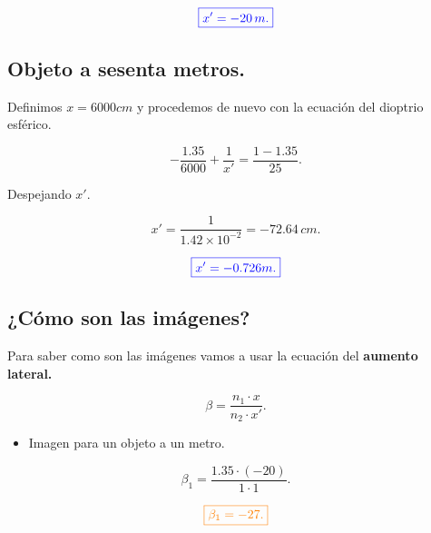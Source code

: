 \documentclass[a4paper,12pt]{article} %
\begin{document}
\vspace{\baselineskip}

\[ \textcolor{blue}{\boxed{ x' = -20 \, m.}} \]

\vspace{\baselineskip}

\subsection{Objeto a sesenta metros.}

\begin{justify}
	Definimos \(x = 6000 cm\) y procedemos de nuevo con la ecuación del dioptrio esférico.
\end{justify}

\[  -\frac{1.35}{6000} + \frac{1}{x'} = \frac{1 - 1.35}{25}. \]

\begin{justify}
	Despejando \(x'\).
\end{justify}

\[ x' = \frac{1}{1.42 \times 10^{-2}} = -72.64 \, cm. \]

\vspace{\baselineskip}

\[ \textcolor{blue}{\boxed{ x' = -0.726 m.}} \]

\vspace{\baselineskip}

\subsection{¿Cómo son las imágenes?}

\begin{justify}
	Para saber como son las imágenes vamos a usar la ecuación del \textbf{aumento lateral.}
\end{justify}

\[ \beta = \frac{n_1 \cdot x}{n_2 \cdot x'}. \]

\begin{itemize}
	\item Imagen para un objeto a un metro.
\end{itemize}

\[ \beta_1 = \frac{1.35 \cdot (-20)}{1 \cdot 1}. \]

\vspace{\baselineskip}

\[ \textcolor{orange}{\boxed{\beta_1 = -27.}} \]

\vspace{\baselineskip}
\end{document}
